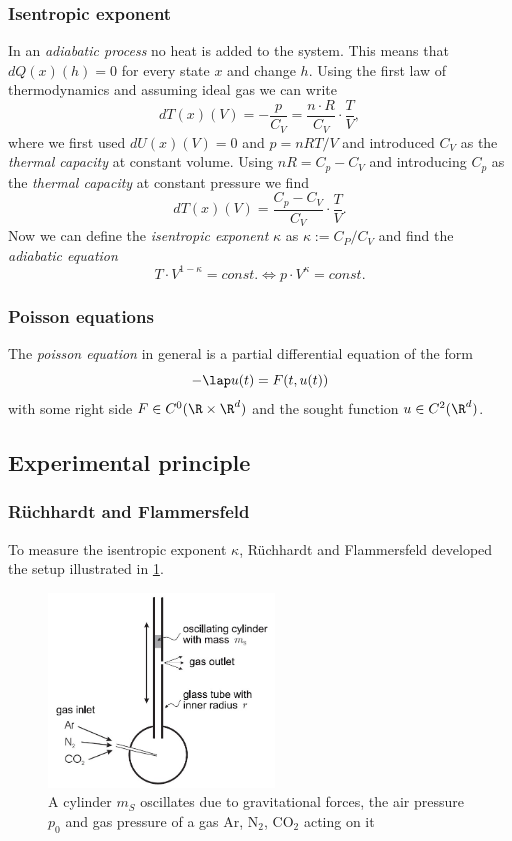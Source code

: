 \documentclass{subfiles}
\begin{document}
        \subsubsection*{Isentropic exponent}
            In an \emph{adiabatic process} no heat is added to the system. This means that $dQ(x)(h) = 0$ for every state $x$ and change $h$. Using the first law of thermodynamics and assuming ideal gas we can write
            \[dT(x)(V) = -\frac{p}{C_V} = \frac{n\cdot R}{C_V}\cdot\frac{T}{V},\]
            where we first used $dU(x)(V) = 0$ and $p = nRT/V$ and introduced $C_V$ as the \emph{thermal capacity} at constant volume. Using $nR = C_p-C_V$ and introducing $C_p$ as the \emph{thermal capacity} at constant pressure we find
            \[dT(x)(V) = \frac{C_p-C_V}{C_V} \cdot\frac{T}{V}.\]
            Now we can define the \emph{isentropic exponent} $\kappa$ as $\kappa:=C_P/C_V$ and find the \emph{adiabatic equation}
            \[T\cdot V^{1-\kappa} = \textit{const}. \Longleftrightarrow p\cdot V^\kappa = \textit{const}.\]

        \subsubsection*{Poisson equations}
            The \emph{poisson equation} in general is a partial differential equation of the form
            \[-\lap u(t) = F(t,u(t))\]
            with some right side $F\in C^0(\R\times\R^d)$ and the sought function $u\in C^2(\R^d)$.
    
    \subsection{Experimental principle}
        \subsubsection*{Rüchhardt and Flammersfeld}\label{sec:RuchhartFlammersfeld}
            To measure the isentropic exponent $\kappa$, Rüchhardt and Flammersfeld developed the setup illustrated in \ref{fig:RuchardtFlammersfeld}.

            \begin{figure}[H]
                \centering
                \includegraphics[width=6cm]{Bilddateien/Grundlagen/IsentropicRuchardtFlammersfeld.jpg}
                \caption{A cylinder $m_S$ oscillates due to gravitational forces, the air pressure $p_0$ and gas pressure of a gas $\text{Ar}$, $\text{N}_2$, $\text{CO}_2$ acting on it}
                \label{fig:RuchardtFlammersfeld}
            \end{figure}
\end{document}
